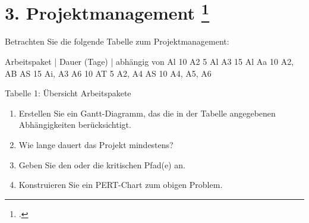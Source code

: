 \documentclass{lehramt-informatik-aufgabe}
\begin{document}

\section{3. Projektmanagement
\footcite[Thema 1 Teilaufgabe 1 Aufgabe 3]{examen:46116:2015:09}}

Betrachten Sie die folgende Tabelle zum Projektmanagement:

Arbeitspaket | Dauer (Tage) | abhängig von
Al 10
A2 5 Al
A3 15 Al
Aa 10 A2, AB
AS 15 Ai, A3
A6 10
AT 5 A2, A4
AS 10 A4, A5, A6

Tabelle 1: Übersicht Arbeitspakete

\begin{enumerate}


\item Erstellen Sie ein Gantt-Diagramm, das die in der Tabelle
angegebenen Abhängigkeiten berücksichtigt.


\item Wie lange dauert das Projekt mindestens?


\item Geben Sie den oder die kritischen Pfad(e) an.


\item Konstruieren Sie ein PERT-Chart zum obigen Problem.

\end{enumerate}
\end{document}
